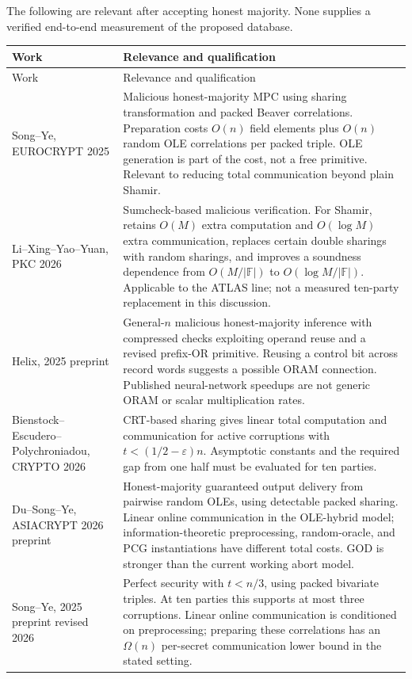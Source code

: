 \documentclass[11pt]{article}
\newcommand{\F}{\mathbb F}
\begin{document}
The following are relevant after accepting honest majority. None supplies a
verified end-to-end measurement of the proposed database.

\begin{longtable}{@{}>{\raggedright\arraybackslash}p{}>{\raggedright\arraybackslash}p{}@{}}
\toprule
Work & Relevance and qualification \\
\midrule
\endfirsthead
\toprule Work & Relevance and qualification \\
\midrule
\endhead
Song--Ye, EUROCRYPT 2025 \cite{songye2025} &
Malicious honest-majority MPC using sharing transformation and packed Beaver
correlations. Preparation costs $O(n)$ field elements plus $O(n)$ random OLE
correlations per packed triple. OLE generation is part of the cost, not a free
primitive. Relevant to reducing total communication beyond plain Shamir. \\
\addlinespace
Li--Xing--Yao--Yuan, PKC 2026 \cite{sumcheck2026} &
Sumcheck-based malicious verification. For Shamir, retains $O(M)$ extra
computation and $O(\log M)$ extra communication, replaces certain double
sharings with random sharings, and improves a soundness dependence from
$O(M/|\F|)$ to $O(\log M/|\F|)$. Applicable to the ATLAS line; not a measured
ten-party replacement in this discussion. \\
\addlinespace
Helix, 2025 preprint \cite{helix2025} &
General-$n$ malicious honest-majority inference with compressed checks exploiting
operand reuse and a revised prefix-OR primitive. Reusing a control bit across
record words suggests a possible ORAM connection. Published neural-network
speedups are not generic ORAM or scalar multiplication rates. \\
\addlinespace
Bienstock--Escudero--Polychroniadou, CRYPTO 2026 \cite{crt2026} &
CRT-based sharing gives linear total computation and communication for active
corruptions with $t<(1/2-\varepsilon)n$. Asymptotic constants and the required
gap from one half must be evaluated for ten parties. \\
\addlinespace
Du--Song--Ye, ASIACRYPT 2026 preprint \cite{god2026} &
Honest-majority guaranteed output delivery from pairwise random OLEs, using
detectable packed sharing. Linear online communication in the OLE-hybrid model;
information-theoretic preprocessing, random-oracle, and PCG instantiations have
different total costs. GOD is stronger than the current working abort model. \\
\addlinespace
Song--Ye, 2025 preprint revised 2026 \cite{perfect2025} &
Perfect security with $t<n/3$, using packed bivariate triples. At ten parties this
supports at most three corruptions. Linear online communication is conditioned
on preprocessing; preparing these correlations has an $\Omega(n)$ per-secret
communication lower bound in the stated setting. \\
\bottomrule
\end{longtable}
\end{document}
